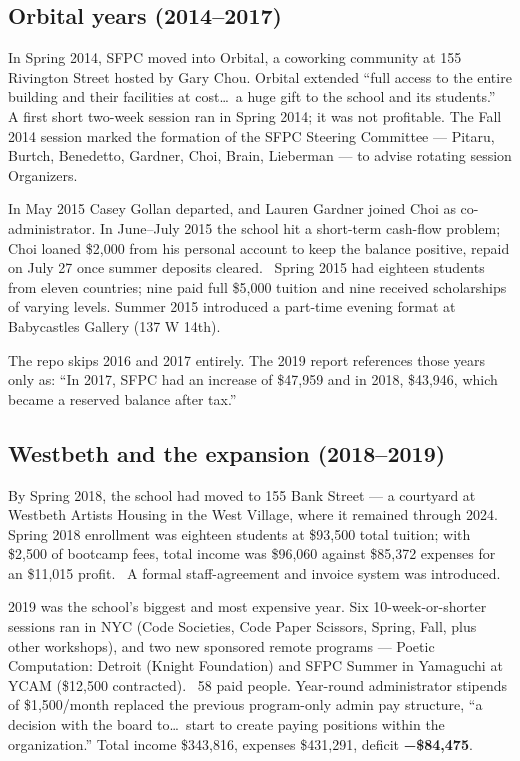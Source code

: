 \documentclass[10pt,letterpaper,twocolumn]{article}
\begin{document}
\subsection{Orbital years (2014--2017)}

In Spring 2014, SFPC moved into Orbital, a coworking community at 155 Rivington Street hosted by Gary Chou. Orbital extended ``full access to the entire building and their facilities at cost\ldots\ a huge gift to the school and its students.''~\citep{sfpc2015report} A first short two-week session ran in Spring 2014; it was not profitable. The Fall 2014 session marked the formation of the SFPC Steering Committee --- Pitaru, Burtch, Benedetto, Gardner, Choi, Brain, Lieberman --- to advise rotating session Organizers.

In May 2015 Casey Gollan departed, and Lauren Gardner joined Choi as co-administrator. In June--July 2015 the school hit a short-term cash-flow problem; Choi loaned \$2,000 from his personal account to keep the balance positive, repaid on July 27 once summer deposits cleared.~\citep{sfpc2015report} Spring 2015 had eighteen students from eleven countries; nine paid full \$5,000 tuition and nine received scholarships of varying levels. Summer 2015 introduced a part-time evening format at Babycastles Gallery (137 W 14th).

The repo skips 2016 and 2017 entirely. The 2019 report references those years only as: ``In 2017, SFPC had an increase of \$47,959 and in 2018, \$43,946, which became a reserved balance after tax.''

\subsection{Westbeth and the expansion (2018--2019)}

By Spring 2018, the school had moved to 155 Bank Street --- a courtyard at Westbeth Artists Housing in the West Village, where it remained through 2024. Spring 2018 enrollment was eighteen students at \$93,500 total tuition; with \$2,500 of bootcamp fees, total income was \$96,060 against \$85,372 expenses for an \$11,015 profit.~\citep{sfpc2018report} A formal staff-agreement and invoice system was introduced.

2019 was the school's biggest and most expensive year. Six 10-week-or-shorter sessions ran in NYC (Code Societies, Code Paper Scissors, Spring, Fall, plus other workshops), and two new sponsored remote programs --- Poetic Computation: Detroit (Knight Foundation) and SFPC Summer in Yamaguchi at YCAM (\$12,500 contracted).~\citep{sfpc2019report} 58 paid people. Year-round administrator stipends of \$1,500/month replaced the previous program-only admin pay structure, ``a decision with the board to\ldots\ start to create paying positions within the organization.'' Total income \$343,816, expenses \$431,291, deficit \textbf{−\$84,475}.
\end{document}
